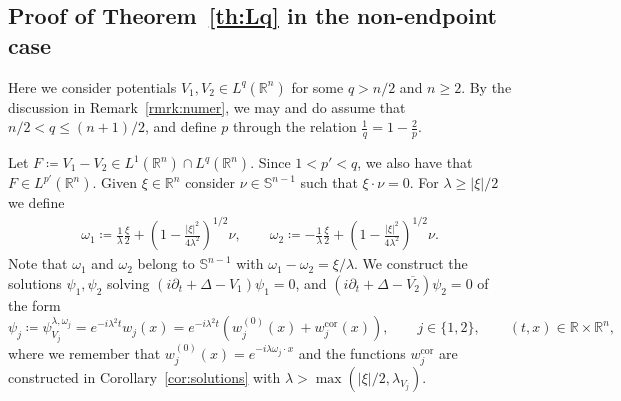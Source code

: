 \documentclass[11pt,a4paper]{amsart}
\theoremstyle{remark}
\theoremstyle{definition}
\newcommand{\R}{\mathbb{R}}
\newcommand{\Sph}{\mathbb{S}}
\def\ovl{\overline}
\begin{document}
\subsection{Proof of Theorem~\ref{th:Lq} in the non-endpoint case}\label{subsec:proof_uniqueness_unbounded} Here we consider potentials $V_1,V_2\in L^q(\R^n)$ for some $q>n/2$ and $n\geq 2$. By the discussion in Remark~\ref{rmrk:numer}, we may and do assume that $n/2<q\leq (n+1)/2$, and define $p$ through the relation $\frac{1}{q}=1-\frac{2}{p}$.

 Let $F\coloneqq V_1 - V_2 \in L^1(\R^n)\cap L^q(\R^n)$.  Since $1<p'<q$, we also have that $F\in L^{p'}(\R^n)$. Given $\xi \in \R^n$ consider $\nu \in \Sph^{n-1}$ such that $\xi \cdot \nu = 0$.
For $\lambda \geq |\xi|/2$ we define
\[
\begin{split}
\omega_1 \coloneqq \frac{1}{\lambda} \frac{\xi}{2} + \left( 1 - \frac{|\xi|^2}{4 \lambda^2} \right)^{1/2} \nu,\qquad \omega_2 \coloneqq -\frac{1}{\lambda} \frac{\xi}{2} +\left( 1 - \frac{|\xi|^2}{4 \lambda^2} \right)^{1/2} \nu.
\end{split}
\]
Note that $\omega_1$ and $\omega_2$ belong to $\Sph^{n-1}$ with $\omega_1 - \omega_2 = \xi/\lambda$. We construct the solutions $\psi_1,\psi_2$ solving $(i\partial_t+\Delta-V_1)\psi_1=0$, and $(i\partial_t+\Delta-\ovl{V_2})\psi_2=0$ of the form
\[
\psi_j\coloneqq \psi_{V_j} ^{\lambda,\omega_j}=e^{-i\lambda^2t}w_j(x)=e^{-i\lambda^2t}(w^{(0)}_j(x)+w^{\mathrm{cor}}_j(x)),\qquad j\in\{1,2\},\qquad (t,x)\in\R\times \R^n,
\]
where we remember that $w^{(0)}_j(x)=e^{-i\lambda \omega_j\cdot x}$ and the functions $w^{\mathrm{cor}}_j$ are constructed in Corollary~\ref{cor:solutions} with $\lambda > \max(|\xi|/2, \lambda_{V_j})$. 
\end{document}
